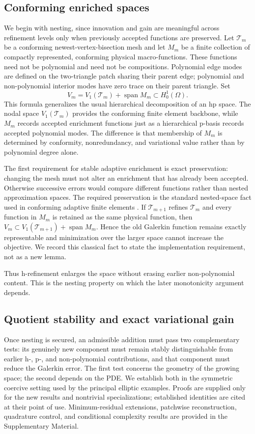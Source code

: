\documentclass[11pt]{article}
\numberwithin{algorithm}{section}
\theoremstyle{definition}\newtheorem{definition}[theorem]{Definition}
\theoremstyle{remark}\newtheorem{remark}[theorem]{Remark}
\begin{document}
\subsection{Conforming enriched spaces}
We begin with nesting, since innovation and gain are meaningful across
refinement levels only when previously accepted functions are preserved.
Let $\mathcal T_m$ be a conforming newest-vertex-bisection mesh and let
$M_m$ be a finite collection of compactly represented, conforming physical
macro-functions.  These functions need not be polynomial and need not be
compositions.  Polynomial edge
modes are defined on the two-triangle patch sharing their parent edge;
polynomial and non-polynomial interior modes have zero trace on their parent
triangle.  Set
\[
 V_m=V_1(\mathcal T_m)+\operatorname{span}M_m\subset H_0^1(\Omega).
\]
This formula generalizes the usual hierarchical decomposition of an hp space.
The nodal space $V_1(\mathcal T_m)$ provides the conforming finite
element backbone, while $M_m$ records accepted enrichment functions just as a
hierarchical p-basis records accepted polynomial modes.  The difference is
that membership of $M_m$ is determined by conformity, nonredundancy, and
variational value rather than by polynomial degree alone.

The first requirement for stable adaptive enrichment is exact
preservation: changing the mesh must not alter
an enrichment that has already been accepted.  Otherwise successive errors
would compare different functions rather than nested approximation spaces.
The required preservation is the standard nested-space fact used in conforming
adaptive finite elements \cite{binevdahmendevore2004,ciarlet1978}.  If
$\mathcal T_{m+1}$ refines $\mathcal T_m$ and every function in $M_m$ is
retained as the same physical function, then
$V_m\subset V_1(\mathcal T_{m+1})+\operatorname{span}M_m$.  Hence the old
Galerkin function remains exactly representable and minimization over the
larger space cannot increase the objective.  We record this classical fact to
state the implementation requirement, not as a new lemma.

Thus h-refinement enlarges the space without erasing earlier non-polynomial
content.  This is the nesting property on which the later monotonicity argument
depends.

\subsection{Quotient stability and exact variational gain}
Once nesting is secured, an admissible addition must pass two complementary
tests: its genuinely new component must remain stably distinguishable from
earlier h-, p-, and non-polynomial contributions, and that component must
reduce the Galerkin error.  The first test concerns the geometry of the growing
space; the second depends on the PDE.  We establish both in the symmetric
coercive setting
used by the principal elliptic examples.  Proofs are supplied only for the
new results and nontrivial specializations; established identities are cited
at their point of use.  Minimum-residual extensions, patchwise reconstruction,
quadrature control, and conditional complexity results are provided in the
Supplementary Material.
\end{document}
